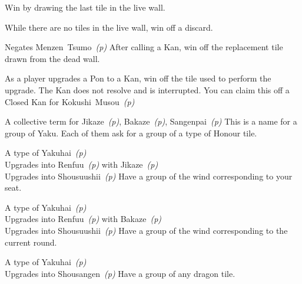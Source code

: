 	{}
	{Win by drawing the last tile in the live wall.}

	{}
	{While there are no tiles in the live wall, win off a discard.}

	{\symbnegate Negates Menzen~Tsumo~\textit{(p\pageref{core:yaku:Menzen Tsumo})}}
	{After calling a Kan, win off the replacement tile drawn from the dead wall.}

	{}
	{As a player upgrades a Pon to a Kan, win off the tile used to perform the upgrade. The Kan does not resolve and is interrupted. You can claim this off a Closed Kan for Kokushi~Musou~\textit{(p\pageref{core:yaku:Kokushi Musou})}}

	{\upgradesto A collective term for Jikaze~\textit{(p\pageref{core:yaku:Jikaze})}, Bakaze~\textit{(p\pageref{core:yaku:Bakaze})}, Sangenpai~\textit{(p\pageref{core:yaku:Sangenpai})}}
	{This is a name for a group of Yaku. Each of them ask for a group of a type of Honour tile.}

	{\upgradesfrom A type of Yakuhai~\textit{(p\pageref{core:yaku:Yakuhai})}\\
	\upgradesto Upgrades into Renfuu~\textit{(p\pageref{core:yaku:Renfuu})} with Jikaze~\textit{(p\pageref{core:yaku:Jikaze})}\\
	\upgradesto Upgrades into Shousuushii~\textit{(p\pageref{core:yaku:Shousuushii})}}
	{Have a group of the wind corresponding to your seat.}

	{\upgradesfrom A type of Yakuhai~\textit{(p\pageref{core:yaku:Yakuhai})}\\
	\upgradesto Upgrades into Renfuu~\textit{(p\pageref{core:yaku:Renfuu})} with Bakaze~\textit{(p\pageref{core:yaku:Bakaze})}\\
	\upgradesto Upgrades into Shousuushii~\textit{(p\pageref{core:yaku:Shousuushii})}}
	{Have a group of the wind corresponding to the current round.}

	{\upgradesfrom A type of Yakuhai~\textit{(p\pageref{core:yaku:Yakuhai})}\\
	\upgradesto Upgrades into Shousangen~\textit{(p\pageref{core:yaku:Shousangen})}}
	{Have a group of any dragon tile.}


